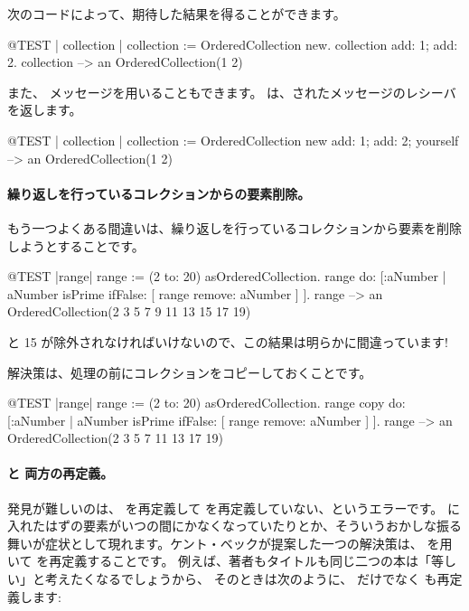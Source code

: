 \documentclass[a4paper,10pt,twoside]{book}
\begin{document}
次のコードによって、期待した結果を得ることができます。
\begin{code}{@TEST | collection |}
collection := OrderedCollection new.
collection add: 1; add: 2.
collection --> an OrderedCollection(1 2)
\end{code}

また、 メッセージを用いることもできます。 は、されたメッセージのレシーバを返します。

\begin{code}{@TEST | collection |}
collection := OrderedCollection new add: 1; add: 2; yourself --> an OrderedCollection(1 2)
\end{code}

\paragraph{繰り返しを行っているコレクションからの要素削除。} もう一つよくある間違いは、繰り返しを行っているコレクションから要素を削除しようとすることです。
\begin{code}{@TEST |range|}
range := (2 to: 20) asOrderedCollection.
range do: [:aNumber | aNumber isPrime ifFalse: [ range remove: aNumber ] ].
range --> an OrderedCollection(2 3 5 7 9 11 13 15 17 19)
\end{code}
 と 15 が除外されなければいけないので、この結果は明らかに間違っています!

解決策は、処理の前にコレクションをコピーしておくことです。
\begin{code}{@TEST |range|}
range := (2 to: 20) asOrderedCollection.
range copy do: [:aNumber | aNumber isPrime ifFalse: [ range remove: aNumber ] ].
range --> an OrderedCollection(2 3 5 7 11 13 17 19)
\end{code}

\paragraph{\ct{=} と  両方の再定義。}
発見が難しいのは、\ct{=} を再定義して を再定義していない、というエラーです。 に入れたはずの要素がいつの間にかなくなっていたりとか、そういうおかしな振る舞いが症状として現れます。ケント・ベックが提案した一つの解決策は、 を用いて  を再定義することです。
例えば、著者もタイトルも同じ二つの本は「等しい」と考えたくなるでしょうから、
そのときは次のように、\ct{=} だけでなく  も再定義します:
\end{document}

